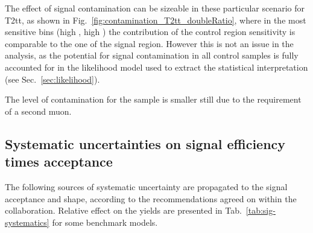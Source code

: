
The effect of signal contamination can be sizeable in these particular scenario
for T2tt, as shown in Fig.~\ref{fig:contamination_T2tt_doubleRatio}, where in
the most sensitive bins (high \nb, high \nj) the contribution of the control
region sensitivity is comparable to the one of the signal region. However this
is not an issue in the analysis, as the potential for signal contamination in
all control samples is fully accounted for in the likelihood model used to
extract the statistical interpretation (see Sec.~\ref{sec:likelihood}).

The level of contamination for the \mmj sample is smaller still due to the
requirement of a second muon.

\subsection{Systematic uncertainties on signal efficiency times acceptance}
\label{sec:sig-syst}
The following sources of systematic uncertainty are propagated to the signal
acceptance and shape, according to the recommendations agreed on within the
collaboration. Relative effect on the yields are presented in
Tab.~\ref{tab:sig-systematics} for some benchmark models.

